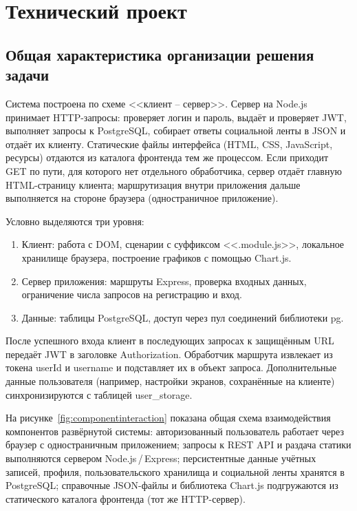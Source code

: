 \section{Технический проект}

\subsection{Общая характеристика организации решения задачи}

Система построена по схеме <<клиент -- сервер>>. Сервер на Node.js принимает HTTP-запросы: проверяет логин и пароль, выдаёт и проверяет JWT, выполняет запросы к PostgreSQL, собирает ответы социальной ленты в JSON и отдаёт их клиенту. Статические файлы интерфейса (HTML, CSS, JavaScript, ресурсы) отдаются из каталога фронтенда тем же процессом. Если приходит GET по пути, для которого нет отдельного обработчика, сервер отдаёт главную HTML-страницу клиента; маршрутизация внутри приложения дальше выполняется на стороне браузера (одностраничное приложение).

Условно выделяются три уровня:
\begin{enumerate}
	\item Клиент: работа с DOM, сценарии с суффиксом <<.module.js>>, локальное хранилище браузера, построение графиков с помощью Chart.js.
	\item Сервер приложения: маршруты Express, проверка входных данных, ограничение числа запросов на регистрацию и вход.
	\item Данные: таблицы PostgreSQL, доступ через пул соединений библиотеки pg.
\end{enumerate}

После успешного входа клиент в последующих запросах к защищённым URL передаёт JWT в заголовке Authorization. Обработчик маршрута извлекает из токена userId и username и подставляет их в объект запроса. Дополнительные данные пользователя (например, настройки экранов, сохранённые на клиенте) синхронизируются с таблицей user\_storage.

На рисунке~\ref{fig:componentinteraction} показана общая схема взаимодействия компонентов развёрнутой системы: авторизованный пользователь работает через браузер с одностраничным приложением; запросы к REST API и раздача статики выполняются сервером Node.js\,/\,Express; персистентные данные учётных записей, профиля, пользовательского хранилища и социальной ленты хранятся в PostgreSQL; справочные JSON-файлы и библиотека Chart.js подгружаются из статического каталога фронтенда (тот же HTTP-сервер).

